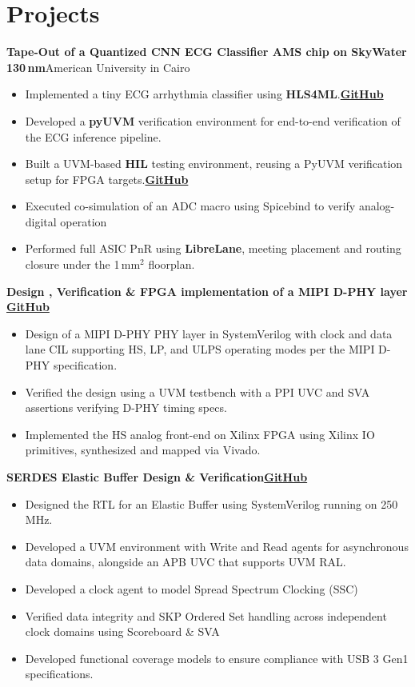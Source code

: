 \documentclass[a4paper,10pt]{article}
\begin{document}
\section*{Projects}
\textbf{Tape-Out of a Quantized CNN ECG Classifier AMS chip on SkyWater 130\,nm}\hfill American University in Cairo
\begin{itemize}
    \item Implemented a tiny ECG arrhythmia classifier using \textbf{HLS4ML}.\hfill \href{https://github.com/mohamedtareq24/QPulse-Tiny-ECG-classifier-ASIC}{\textbf{GitHub}}
    \item Developed a \textbf{pyUVM} verification environment for end-to-end verification of the ECG inference pipeline.
    \item Built a UVM-based \textbf{HIL} testing environment, reusing a PyUVM verification setup for FPGA targets.\hfill\href{https://github.com/mohamedtareq24/pyuvm-asyncio-HIL}{\textbf{GitHub}}
    \item Executed co-simulation of an ADC macro using Spicebind to verify analog-digital operation
    \item Performed full ASIC PnR using \textbf{LibreLane}, meeting placement and routing closure under the 1\,mm$^2$ floorplan.
\end{itemize}

\textbf  {Design , Verification \& FPGA implementation of a MIPI D-PHY layer}\hfill
\href{https://github.com/mohamedtareq24/MIPI-D-PHY-TX-RX.git}{\textbf{GitHub}}
\begin{itemize}
  \item Design of a MIPI D-PHY PHY layer in SystemVerilog with clock and data lane CIL supporting HS, LP, and ULPS operating modes per the MIPI D-PHY specification.
  \item Verified the design using a UVM testbench with a PPI UVC and SVA assertions verifying D-PHY timing specs.
  \item Implemented the HS analog front-end on Xilinx FPGA using Xilinx IO primitives, synthesized and mapped via Vivado.
\end{itemize}
\textbf{SERDES Elastic Buffer Design \& Verification}\hfill  \href{https://github.com/mohamedtareq24/Elastic-Buffer-Design-UVM-Verification}{\textbf{{GitHub}}}
\begin{itemize}
    \item Designed the RTL for an Elastic Buffer using SystemVerilog running on 250 MHz.
    \item Developed a UVM environment with Write and Read agents for asynchronous data domains, alongside an APB UVC that supports UVM RAL.
    \item Developed a clock agent to model Spread Spectrum Clocking (SSC)
    \item Verified data integrity and SKP Ordered Set handling across independent clock domains using Scoreboard \& SVA
    \item Developed functional coverage models to ensure compliance with USB 3 Gen1 specifications.
\end{itemize}
\end{document}
